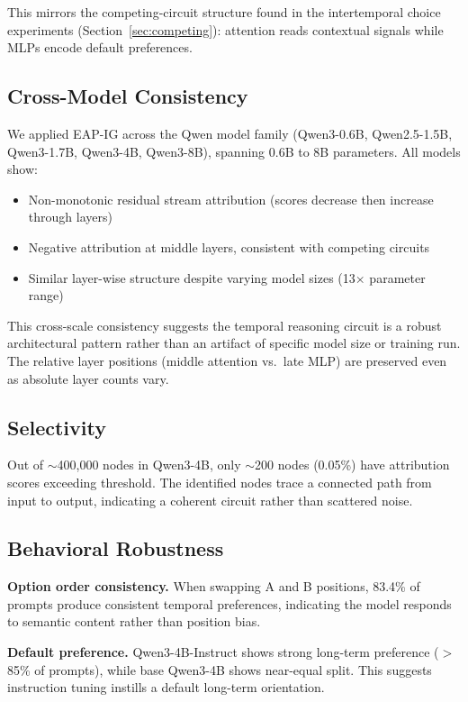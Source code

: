 \documentclass{article}
\begin{document}
This mirrors the competing-circuit structure found in the intertemporal choice experiments (Section~\ref{sec:competing}): attention reads contextual signals while MLPs encode default preferences.

\subsection{Cross-Model Consistency}

We applied EAP-IG across the Qwen model family (Qwen3-0.6B, Qwen2.5-1.5B, Qwen3-1.7B, Qwen3-4B, Qwen3-8B), spanning 0.6B to 8B parameters. All models show:
\begin{itemize}
    \item Non-monotonic residual stream attribution (scores decrease then increase through layers)
    \item Negative attribution at middle layers, consistent with competing circuits
    \item Similar layer-wise structure despite varying model sizes (13$\times$ parameter range)
\end{itemize}

This cross-scale consistency suggests the temporal reasoning circuit is a robust architectural pattern rather than an artifact of specific model size or training run. The relative layer positions (middle attention vs.\ late MLP) are preserved even as absolute layer counts vary.

\subsection{Selectivity}

Out of $\sim$400,000 nodes in Qwen3-4B, only $\sim$200 nodes (0.05\%) have attribution scores exceeding threshold. The identified nodes trace a connected path from input to output, indicating a coherent circuit rather than scattered noise.

\subsection{Behavioral Robustness}

\textbf{Option order consistency.} When swapping A and B positions, 83.4\% of prompts produce consistent temporal preferences, indicating the model responds to semantic content rather than position bias.

\textbf{Default preference.} Qwen3-4B-Instruct shows strong long-term preference ($>$85\% of prompts), while base Qwen3-4B shows near-equal split. This suggests instruction tuning instills a default long-term orientation.
\end{document}
